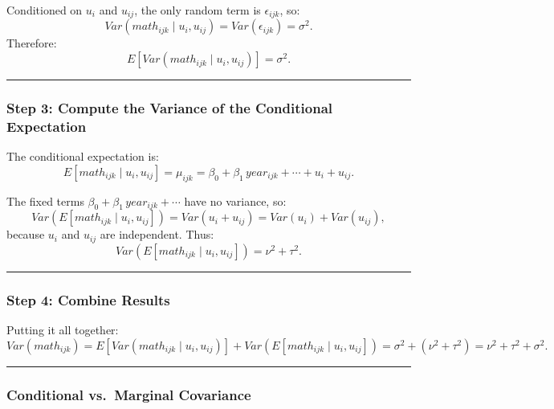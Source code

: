 \documentclass[
  letterpaper,
  DIV=11,
  numbers=noendperiod]{scrreprt}
\begin{document}
\begin{tcolorbox}[enhanced jigsaw, rightrule=.15mm, breakable, left=2mm, colframe=quarto-callout-tip-color-frame, opacityback=0, leftrule=.75mm, toprule=.15mm, colback=white, arc=.35mm, bottomrule=.15mm]
Conditioned on \(u_i\) and \(u_{ij}\), the only random term is
\(\epsilon_{ijk}\), so: \[
Var(math_{ijk} \mid u_i, u_{ij}) = Var(\epsilon_{ijk}) = \sigma^2.
\] Therefore: \[
E[Var(math_{ijk} \mid u_i, u_{ij})] = \sigma^2.
\]

\begin{center}\rule{0.5\linewidth}{0.5pt}\end{center}

\hypertarget{step-3-compute-the-variance-of-the-conditional-expectation}{%
\subsubsection*{Step 3: Compute the Variance of the Conditional
Expectation}\label{step-3-compute-the-variance-of-the-conditional-expectation}}

The conditional expectation is: \[
E[math_{ijk} \mid u_i, u_{ij}] = \mu_{ijk} = \beta_0 + \beta_1 \, year_{ijk} + \cdots + u_i + u_{ij}.
\]

The fixed terms \(\beta_0 + \beta_1 \, year_{ijk} + \cdots\) have no
variance, so: \[
Var(E[math_{ijk} \mid u_i, u_{ij}]) = Var(u_i + u_{ij}) = Var(u_i) + Var(u_{ij}),
\] because \(u_i\) and \(u_{ij}\) are independent. Thus: \[
Var(E[math_{ijk} \mid u_i, u_{ij}]) = \nu^2 + \tau^2.
\]

\begin{center}\rule{0.5\linewidth}{0.5pt}\end{center}

\hypertarget{step-4-combine-results}{%
\subsubsection*{Step 4: Combine Results}\label{step-4-combine-results}}

Putting it all together: \[
Var(math_{ijk}) = E[Var(math_{ijk} \mid u_i, u_{ij})] + Var(E[math_{ijk} \mid u_i, u_{ij}])
= \sigma^2 + (\nu^2 + \tau^2)
= \nu^2 + \tau^2 + \sigma^2.
\]

\end{tcolorbox}

\begin{center}\rule{0.5\linewidth}{0.5pt}\end{center}

\hypertarget{conditional-vs.-marginal-covariance}{%
\subsubsection*{Conditional vs.~Marginal
Covariance}\label{conditional-vs.-marginal-covariance}}
\end{document}
